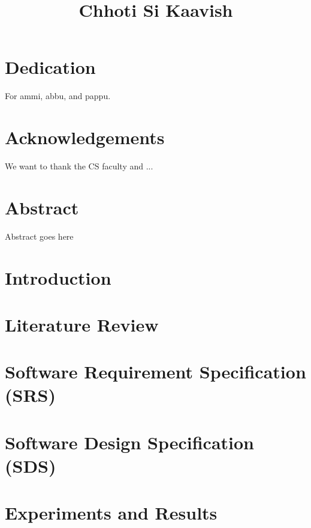 \documentclass[12pt,twosided]{report}
\title{Chhoti Si Kaavish}
\begin{document}

\chapter*{Dedication}
For ammi, abbu, and pappu.

\chapter*{Acknowledgements}
We want to thank the CS faculty and ...

\chapter*{Abstract}
Abstract goes here

\tableofcontents
\listoffigures
\listoftables

\chapter{Introduction}
\label{chap:intro}


\chapter{Literature Review}
\label{chap:lit}


\chapter{Software Requirement Specification (SRS)}
\label{chap:srs}


\chapter{Software Design Specification (SDS)}
\label{chap:sds}


\chapter{Experiments and Results}
\label{chap:results}

\end{document}

